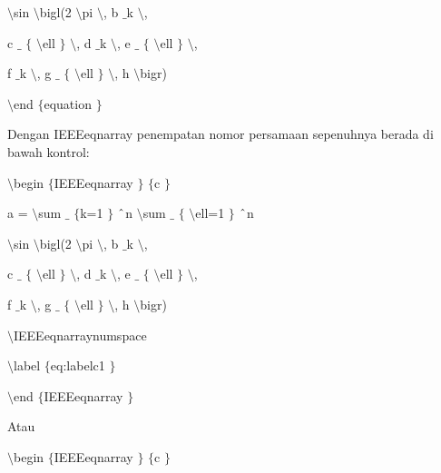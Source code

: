\vspace{12pt}
\noindent 
 $  \setminus  $sin  $  \setminus  $bigl(2 $  \setminus  $pi  $  \setminus  $, b $  \_  $k  $  \setminus  $, \par
\vspace{12pt}
\noindent 
c $  \_  $ $  \{  $ $  \setminus  $ell $  \}  $  $  \setminus  $, d $  \_  $k  $  \setminus  $, e $  \_  $ $  \{  $ $  \setminus  $ell $  \}  $  $  \setminus  $, \par
\vspace{12pt}
\noindent 
f $  \_  $k  $  \setminus  $, g $  \_  $ $  \{  $ $  \setminus  $ell $  \}  $  $  \setminus  $, h  $  \setminus  $bigr) \par
\vspace{12pt}
\noindent 
 $  \setminus  $end $  \{  $equation $  \}  $ \par
\vspace{12pt}
\noindent 
Dengan IEEEeqnarray penempatan nomor persamaan sepenuhnya berada di bawah kontrol: \par
\vspace{12pt}
\noindent 
 $  \setminus  $begin $  \{  $IEEEeqnarray $  \}  $ $  \{  $c $  \}  $ \par
\noindent 
a =  $  \setminus  $sum $  \_  $ $  \{  $k=1 $  \}  $ $  \string^  $n $  \setminus  $sum $  \_  $ $  \{  $ $  \setminus  $ell=1 $  \}  $ $  \string^  $n \par
\noindent 
 $  \setminus  $sin  $  \setminus  $bigl(2 $  \setminus  $pi  $  \setminus  $, b $  \_  $k  $  \setminus  $, \par
\noindent 
c $  \_  $ $  \{  $ $  \setminus  $ell $  \}  $  $  \setminus  $, d $  \_  $k  $  \setminus  $, e $  \_  $ $  \{  $ $  \setminus  $ell $  \}  $  $  \setminus  $, \par
\noindent 
f $  \_  $k  $  \setminus  $, g $  \_  $ $  \{  $ $  \setminus  $ell $  \}  $  $  \setminus  $, h  $  \setminus  $bigr) \par
\noindent 
 $  \setminus  $IEEEeqnarraynumspace \par
\noindent 
 $  \setminus  $label $  \{  $eq:labelc1 $  \}  $ \par
\noindent 
 $  \setminus  $end $  \{  $IEEEeqnarray $  \}  $ \par
\noindent 
\vspace{12pt}
\noindent 
\vspace{12pt}
\noindent 
Atau \par
\noindent 
\vspace{12pt}
\noindent 
 $  \setminus  $begin $  \{  $IEEEeqnarray $  \}  $ $  \{  $c $  \}  $ \par

